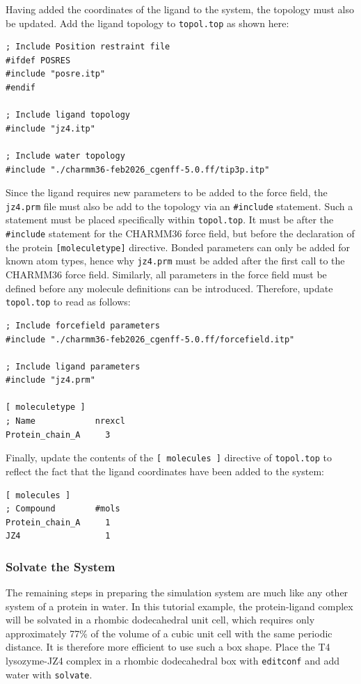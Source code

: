 \documentclass[9pt,tutorial,pubversion]{livecoms}
\begin{document}
Having added the coordinates of the ligand to the system, the topology must also be updated. Add the ligand topology to \texttt{topol.top} as shown here:

\begin{lstlisting}
; Include Position restraint file
#ifdef POSRES
#include "posre.itp"
#endif

; Include ligand topology
#include "jz4.itp"

; Include water topology
#include "./charmm36-feb2026_cgenff-5.0.ff/tip3p.itp"
\end{lstlisting}

Since the ligand requires new parameters to be added to the force field, the \texttt{jz4.prm} file must also be add to the topology via an \texttt{\#include} statement. Such a statement must be placed specifically within \texttt{topol.top}. It must be after the \texttt{\#include} statement for the CHARMM36 force field, but before the declaration of the protein \texttt{[moleculetype]} directive. Bonded parameters can only be added for known atom types, hence why \texttt{jz4.prm} must be added after the first call to the CHARMM36 force field. Similarly, all parameters in the force field must be defined before any molecule definitions can be introduced. Therefore, update \texttt{topol.top} to read as follows:

\begin{lstlisting}[basicstyle=\small\ttfamily]
; Include forcefield parameters
#include "./charmm36-feb2026_cgenff-5.0.ff/forcefield.itp"

; Include ligand parameters
#include "jz4.prm"

[ moleculetype ]
; Name            nrexcl
Protein_chain_A     3
\end{lstlisting}

Finally, update the contents of the \texttt{[ molecules ]} directive of \texttt{topol.top} to reflect the fact that the ligand coordinates have been added to the system:

\begin{lstlisting}[basicstyle=\small\ttfamily]
[ molecules ]
; Compound        #mols
Protein_chain_A     1
JZ4                 1
\end{lstlisting}

\subsubsection{Solvate the System} \label{complex_solv}

The remaining steps in preparing the simulation system are much like any other system of a protein in water. In this tutorial example, the protein-ligand complex will be solvated in a rhombic dodecahedral unit cell, which requires only approximately 77\% of the volume of a cubic unit cell with the same periodic distance. It is therefore more efficient to use such a box shape. Place the T4 lysozyme-JZ4 complex in a rhombic dodecahedral box with \texttt{editconf} and add water with \texttt{solvate}.
\end{document}
